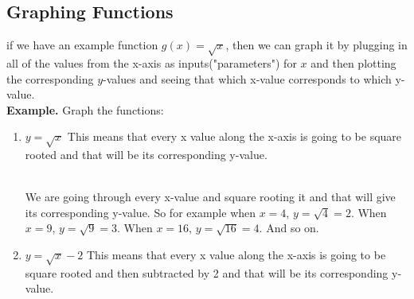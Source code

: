 \subsection{Graphing Functions}
if we have an example function $g(x) = \sqrt{x}$, then we can graph it by plugging in all of the values from the x-axis as inputs("parameters") for $x$ and then plotting the corresponding $y$-values and seeing that which x-value corresponds to which y-value. \\
\textbf{Example.} Graph the functions: \\
\begin{enumerate}
	\item $y=\sqrt{x}$ This means that every x value along the x-axis is going to be square rooted and that will be its corresponding y-value. \\
	 \\
		We are going through every x-value and square rooting it and that will give its corresponding y-value.
		So for example when $x=4$, $y=\sqrt{4}=2$. When $x=9$, $y=\sqrt{9}=3$. When $x=16$, $y=\sqrt{16}=4$. And so on. \\  
		\item $y=\sqrt{x}-2$ This means that every x value along the x-axis is going to be square rooted and then subtracted by 2 and that will be its corresponding y-value. \\
\end{enumerate}
